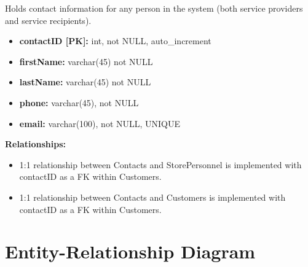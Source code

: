 \documentclass{article}
\begin{document}
\begin{tcolorbox}[colback=secondarycolor, colframe=primarycolor, title=\textbf{Contacts Table}]
Holds contact information for any person in the system (both service providers and service recipients).
 
 \vspace{0.2cm}

\begin{itemize}
  \item \textbf{contactID [PK]:} int, not NULL, auto\_increment
  \item \textbf{firstName:} varchar(45) not NULL
  \item \textbf{lastName:} varchar(45) not NULL
  \item \textbf{phone:} varchar(45), not NULL
  \item \textbf{email:} varchar(100), not NULL, UNIQUE
\end{itemize}
\vspace{0.2cm}

\textbf{Relationships:}
\vspace{0.2cm}
\begin{itemize}
   \item 1:1 relationship between Contacts and StorePersonnel is implemented with contactID as a FK within Customers.
   \item 1:1 relationship between Contacts and Customers is implemented with contactID as a FK within Customers.
\end{itemize}
\end{tcolorbox}

\vspace{0.5cm}

\section{Entity-Relationship Diagram}
\end{document}
